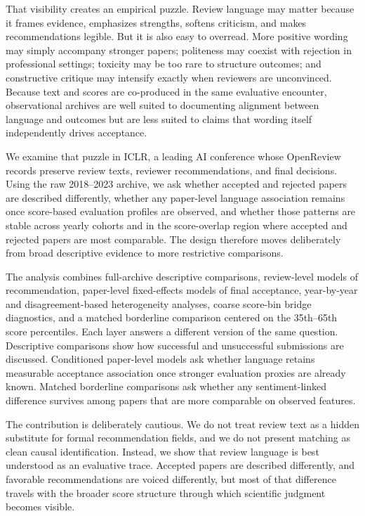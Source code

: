 \documentclass[9pt,twocolumn]{pnas-new}
\begin{document}
That visibility creates an empirical puzzle. Review language may matter because it frames evidence, emphasizes strengths, softens criticism, and makes recommendations legible. But it is also easy to overread. More positive wording may simply accompany stronger papers; politeness may coexist with rejection in professional settings; toxicity may be too rare to structure outcomes; and constructive critique may intensify exactly when reviewers are unconvinced. Because text and scores are co-produced in the same evaluative encounter, observational archives are well suited to documenting alignment between language and outcomes but are less suited to claims that wording itself independently drives acceptance.

We examine that puzzle in ICLR, a leading AI conference whose OpenReview records preserve review texts, reviewer recommendations, and final decisions. Using the raw 2018--2023 archive, we ask whether accepted and rejected papers are described differently, whether any paper-level language association remains once score-based evaluation profiles are observed, and whether those patterns are stable across yearly cohorts and in the score-overlap region where accepted and rejected papers are most comparable. The design therefore moves deliberately from broad descriptive evidence to more restrictive comparisons.

The analysis combines full-archive descriptive comparisons, review-level models of recommendation, paper-level fixed-effects models of final acceptance, year-by-year and disagreement-based heterogeneity analyses, coarse score-bin bridge diagnostics, and a matched borderline comparison centered on the 35th--65th score percentiles. Each layer answers a different version of the same question. Descriptive comparisons show how successful and unsuccessful submissions are discussed. Conditioned paper-level models ask whether language retains measurable acceptance association once stronger evaluation proxies are already known. Matched borderline comparisons ask whether any sentiment-linked difference survives among papers that are more comparable on observed features.

The contribution is deliberately cautious. We do not treat review text as a hidden substitute for formal recommendation fields, and we do not present matching as clean causal identification. Instead, we show that review language is best understood as an evaluative trace. Accepted papers are described differently, and favorable recommendations are voiced differently, but most of that difference travels with the broader score structure through which scientific judgment becomes visible.
\end{document}
